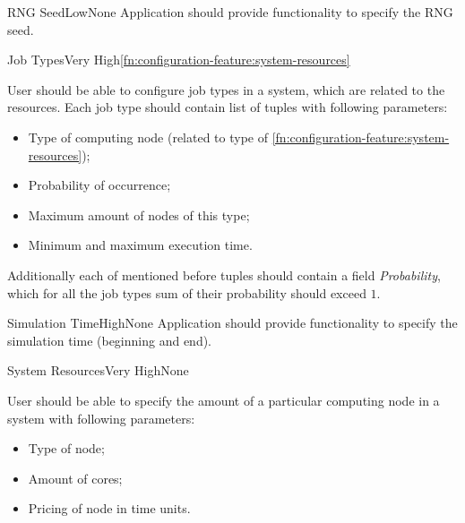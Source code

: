 	\begin{functional}{\gls{RNG} Seed}{Low}{None}
		\label{fn:configuration-feature:rng-seed}
		{
			Application should provide functionality to specify the \gls{RNG} seed.
		}
	\end{functional}

	\begin{functional}{Job Types}{Very High}{\ref{fn:configuration-feature:system-resources}}
		\label{fn:configuration-feature:job-types}
		{
			User should be able to configure job types in a system, which are related to the resources. Each job type should contain list of tuples with following parameters:
			\begin{itemize}
				\item Type of \gls{computing node} (related to type of \ref{fn:configuration-feature:system-resources});
				\item Probability of occurrence;
				\item Maximum amount of nodes of this type;
				\item Minimum and maximum execution time.
			\end{itemize}
			Additionally each of mentioned before tuples should contain a field \emph{Probability}, which for all the job types sum of their probability should exceed $1$.
		}
	\end{functional}

	\begin{functional}{Simulation Time}{High}{None}
		\label{fn:configuration-feature:simulation-time}
		{
			Application should provide functionality to specify the simulation time (beginning and end). 
		}
	\end{functional}

	\begin{functional}{System Resources}{Very High}{None}
		\label{fn:configuration-feature:system-resources}
		{
			User should be able to specify the amount of a particular \gls{computing node} in a system with following parameters:
			\begin{itemize}
				\item Type of node;
				\item Amount of cores;
				\item Pricing of node in time units.
			\end{itemize}
		}
	\end{functional}

